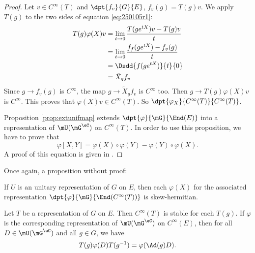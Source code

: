 \begin{proof}
Let $v\in C^{\infty}(T)$ and $\dpt{f_v}{G}{E}$, $f_v(g)=T(g)v$. We apply $T(g)$ to the two sides of equation \eqref{eq:250105r1}:
\begin{equation}
\begin{split}
T(g)\varphi(X)v&=\lim_{t\to 0}\frac{T(ge^{tX})v-T(g)v}{t}\\
		&=\lim_{t\to0}\frac{f_f(ge^{tX})-f_v(g)}{t}\\
		&=\Dsdd{ f(ge^{tX}) }{t}{0}\\
		&=\tilde X_gf_v
\end{split}
\end{equation}
Since $g\to f_v(g)$ is $ C^{\infty}$, the map $g\to\tilde X_gf_v$ is $ C^{\infty}$ too. Then $g\to T(g)\varphi(X)v$ is $ C^{\infty}$. This proves that $\varphi(X)v\in C^{\infty}(T)$. So $\dpt{\varphi_X}{ C^{\infty}(T)}{ C^{\infty}(T)}$.

Proposition \ref{prop:extunifmap} extends $\dpt{\varphi}{\mG}{\End(E)}$ into a representation of $\mU(\mG^{\eC})$ on $ C^{\infty}(T)$. In order to use this proposition, we have to prove that 
\[ 
  \varphi[X,Y]=\varphi(X)\circ\varphi(Y)-\varphi(Y)\circ\varphi(X).
\]
A proof of this equation is given in \cite{Knapp_reprez}.

 
\end{proof}	
Once again, a proposition without proof:

\begin{proposition}
 If $U$ is an unitary representation of $G$ on $E$, then each $\varphi(X)$ for the associated representation $\dpt{\varphi}{\mG}{\End( C^{\infty}(T))}$ is skew-hermitian.
\end{proposition}


\begin{proposition}
Let $T$ be a representation of $G$ on $E$. Then $ C^{\infty}(T)$ is stable for each $T(g)$. If $\varphi$ is the corresponding representation of $\mU(\mG^{\eC})$ on $ C^{\infty}(E)$, then for all $D\in\mU(\mG^{\eC})$ and all $g\in G$, we have
\[ 
  T(g)\varphi(D)T(g^{-1})=\varphi(\Ad(g)D).
\]
\end{proposition}

